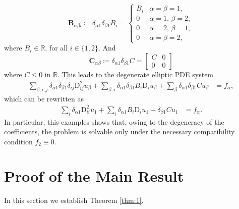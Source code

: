 \documentclass{amsart}
\numberwithin{equation}{section}
\numberwithin{thm}{section}
\theoremstyle{definition}
\def\R{\mathbb{R}}
\renewcommand{\:}{\!:\!} %
\renewcommand{\^}[1]{^{#1}_{\phantom{l}}}
\begin{document}
\begin{equation*}
\mathbf{B}_{\alpha \beta i} \coloneqq  \delta_{\alpha 1} \delta_{\beta 1}B_i = \begin{cases}
B_i &\text{$\alpha = \beta = 1$},\\
0 &\text{$\alpha = 1$, $\beta = 2$},\\
0 &\text{$\alpha = 2$, $\beta = 1$},\\
0 &\text{$\alpha = \beta = 2$},
\end{cases} 
\end{equation*}
where $B_i \in \mathbb{R}$, for all $i \in \{1, 2\}$. And
\begin{equation*}
\mathbf{C}_{\alpha \beta} \coloneqq  \delta_{\alpha 1} \delta_{\beta 1}C= \begin{bmatrix}
C & 0 \\
0 & 0
\end{bmatrix}
\end{equation*}
where $C \leq 0$ in $\R$. This leads to the degenerate elliptic PDE system
\begin{align*}
\sum_{\beta, i, j} \delta_{\alpha 1} \delta_{\beta 1}\delta_{i j} \mathrm{D}_{ij}^{2}u_{\beta} + \sum_{\beta, i} \delta_{\alpha 1} \delta_{\beta 1}B_i \mathrm{D}_{i}u_{\beta} + \sum_{\beta}  \delta_{\alpha 1} \delta_{\beta 1}Cu_{\beta} &= f_{\alpha},
\end{align*}
which can be rewritten as
\begin{align*}
\sum_{i} \delta_{\alpha 1} \mathrm{D}_{ii}^{2}u_{1} + \sum_{i} \delta_{\alpha 1} B_i \mathrm{D}_{i}u_{1} + \delta_{\beta 1}Cu_{1} &= f_{\alpha}.
\end{align*}
In particular, this examples shows that, owing to the degeneracy of the coefficients, the problem is solvable only under the necessary compatibility condition $f_2\equiv0$.








\section{Proof of the Main Result}

In this section we establish Theorem \ref{thm:1}.
\end{document}
